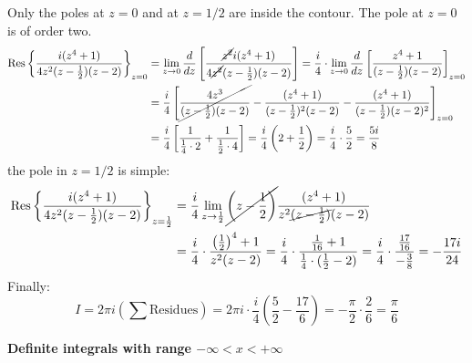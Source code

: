 \documentclass{article}
\begin{document}
\newpage
\noindent
Only the poles at $z=0$ and at $z=1/2$ are inside the contour. The pole at $z=0$ is of order two.
\begin{align*}
    \text{Res} \left\{ \frac{i(z^4 + 1)}{4z^2(z - \frac{1}{2})(z - 2)} \right\}_{z=0}
&= \lim_{z \to 0} \frac{d}{dz} \left[ \frac{\cancel{z^2} i(z^4 + 1)}{4 \cancel{z^2} (z - \frac{1}{2})(z - 2)} \right] = \frac{i}{4} \cdot \lim_{z \to 0} \frac{d}{dz} \left[ \frac{z^4 + 1}{(z - \frac{1}{2})(z - 2)} \right]_{z = 0}\\
&=  \frac{i}{4} \left[ \cancel{\frac{4z^3}{(z - \frac{1}{2})(z - 2)} } - \frac{(z^4 + 1)}{(z - \frac{1}{2})^2(z - 2)} - \frac{(z^4 + 1)}{(z - \frac{1}{2})(z - 2)^2} \right]_{z=0}\\
&= \frac{i}{4} \left[ \frac{1}{\frac{1}{4} \cdot 2} + \frac{1}{\frac{1}{2} \cdot 4} \right]
= \frac{i}{4} \left( 2 + \frac{1}{2} \right)
= \frac{i}{4} \cdot \frac{5}{2} = \frac{5i}{8}
\end{align*}
the pole in $z=1/2$ is simple:
\begin{align*}
    \text{Res} \left\{ \frac{i(z^4 + 1)}{4z^2(z - \frac{1}{2})(z - 2)} \right\}_{z = \frac{1}{2}}
&= \frac{i}{4} \lim_{z \to \frac{1}{2}} \cancel{\left(z - \frac{1}{2}\right)}\frac{(z^4 + 1)}{z^2\cancel{(z - \frac{1}{2})}(z - 2)}\\
&= \frac{i}{4} \cdot \frac{\left(\frac{1}{2}\right)^4 + 1}{ z^2 ( z - 2 )}
= \frac{i}{4} \cdot \frac{ \frac{1}{16} + 1 }{ \frac{1}{4} \cdot (\frac{1}{2} -2) }
= \frac{i}{4} \cdot \frac{ \frac{17}{16} }{ -\frac{3}{8} } = -\frac{17i}{24}
\end{align*}
Finally:
\begin{equation}
    I = 2\pi i \left( \sum \text{Residues} \right)
= 2\pi i \cdot \frac{i}{4} \left( \frac{5}{2} - \frac{17}{6} \right)
= -\frac{\pi}{2} \cdot \frac{2}{6}
= \frac{\pi}{6}
\end{equation}

\vspace{2mm}\noindent
\textbf{Definite integrals with range $-\infty < x < +\infty$}
\end{document}
